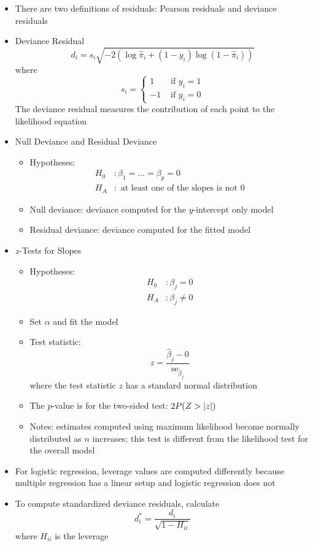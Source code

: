\documentclass[12pt]{article}
\begin{document}
\begin{itemize}
\item There are two definitions of residuals: Pearson residuals and deviance residuals 
\item Deviance Residual $$ d_i = s_i \sqrt{-2(\log \hat{\pi}_i + (1-y_i)\log(1-\hat{\pi}_i))} $$ where $$ s_i = \begin{cases} 1 &\text{ if } y_i = 1 \\ -1 &\text{ if } y_i = 0 \end{cases} $$ The deviance residual measures the contribution of each point to the likelihood equation 
\item Null Deviance and Residual Deviance \begin{itemize} 
\item Hypotheses: $$ \begin{aligned} H_0 &: \beta_1 = \dots = \beta_p = 0 \\ H_A &: \text{ at least one of the slopes is not } 0 \end{aligned} $$ 
\item Null deviance: deviance computed for the $y$-intercept only model 
\item Residual deviance: deviance computed for the fitted model \end{itemize} 
\item $z$-Tests for Slopes \begin{itemize} 
\item Hypotheses: $$ \begin{aligned} H_0 &: \beta_j = 0 \\ H_A &: \beta_j \neq 0 \end{aligned} $$ 
\item Set $\alpha$ and fit the model 
\item Test statistic: $$ z = \frac{\hat{\beta}_j - 0}{\text{se}_{\hat{\beta}_j}} $$ where the test statistic $z$ has a standard normal distribution 
\item The $p$-value is for the two-sided test: $2P(Z > \abs{z})$  
\item Notes: estimates computed using maximum likelihood become normally distributed as $n$ increases; this test is different from the likelihood test for the overall model \end{itemize} 
\item For logistic regression, leverage values are computed differently because multiple regression has a linear setup and logistic regression does not 
\item To compute standardized deviance residuals, calculate $$ d_i^* = \frac{d_i}{\sqrt{1-H_{ii}}} $$ where $H_{ii}$ is the leverage 

\end{itemize}
\end{document}
